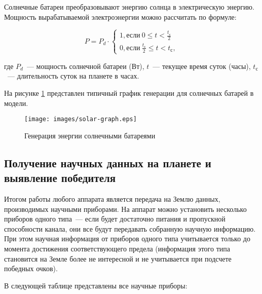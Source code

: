 \documentclass[12pt,a4paper]{article}
\begin{document}
Солнечные батареи преобразовывают энергию солнца в электрическую энергию. Мощность
вырабатываемой электроэнергии можно рассчитать по формуле:

$$
P = P_d \cdot \left\{
  \begin{array}{c}
    1, \text{если}~0 \leqslant t < \frac{t_{\text{с}}}{2}\\
    0, \text{если}~\frac{t_{\text{с}}}{2} \leqslant t < t_{\text{с}},
  \end{array}
\right.
$$

где $P_d$~--- мощность солнечной батареи (Вт), $t$~--- текущее время суток (часы),
$t_{\text{с}}$~--- длительность суток на планете в часах.

На рисунке \ref{Pic:solar} представлен типичный график генерации для солнечных батарей в
модели.

\begin{figure}[tbh]
  \begin{center}
    \texttt{[image: images/solar-graph.eps]}
    \caption{Генерация энергии солнечными батареями}
    \label{Pic:solar}
  \end{center}
\end{figure}

\subsection{Получение научных данных на планете и выявление победителя}

Итогом работы любого аппарата является передача на Землю данных, производимых научными
приборами. На аппарат можно установить несколько приборов одного типа~--- если будет
достаточно питания и пропускной способности канала, они все будут передавать собранную
научную информацию. При этом научная информация от приборов одного типа учитывается только
до момента достижения соответствующего предела (информация этого типа становится на Земле
более не интересной и не учитывается при подсчете победных очков).

В следующей таблице представлены все научные приборы:
\end{document}
